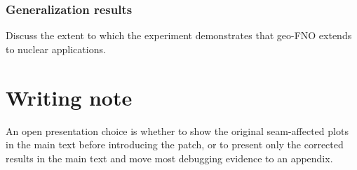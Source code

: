 \subsubsection{Generalization results}

Discuss the extent to which the experiment demonstrates that geo-FNO
extends to nuclear applications.

\section{Writing note}

An open presentation choice is whether to show the original seam-affected
plots in the main text before introducing the patch, or to present only
the corrected results in the main text and move most debugging evidence
to an appendix.

